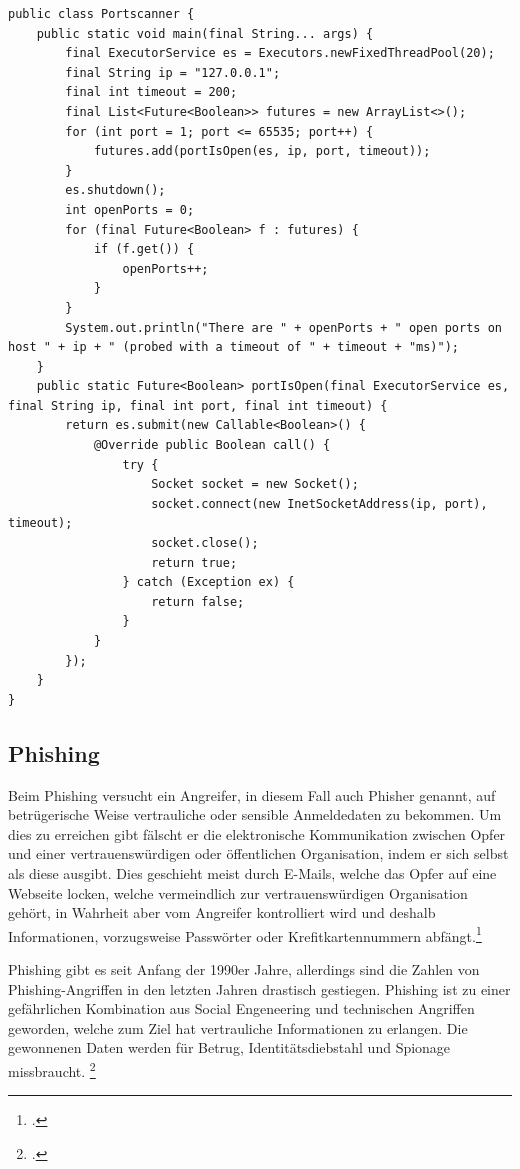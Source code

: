 \begin{scriptsize}
\begin{lstlisting}
public class Portscanner {
    public static void main(final String... args) {
        final ExecutorService es = Executors.newFixedThreadPool(20);
        final String ip = "127.0.0.1";
        final int timeout = 200;
        final List<Future<Boolean>> futures = new ArrayList<>();
        for (int port = 1; port <= 65535; port++) {
            futures.add(portIsOpen(es, ip, port, timeout));
        }
        es.shutdown();
        int openPorts = 0;
        for (final Future<Boolean> f : futures) {
            if (f.get()) {
                openPorts++;
            }
        }
        System.out.println("There are " + openPorts + " open ports on host " + ip + " (probed with a timeout of " + timeout + "ms)");
    }
    public static Future<Boolean> portIsOpen(final ExecutorService es, final String ip, final int port, final int timeout) {
        return es.submit(new Callable<Boolean>() {
            @Override public Boolean call() {
                try {
                    Socket socket = new Socket();
                    socket.connect(new InetSocketAddress(ip, port), timeout);
                    socket.close();
                    return true;
                } catch (Exception ex) {
                    return false;
                }
            }
        });
    }
}
\end{lstlisting}
\end{scriptsize}


\subsection{Phishing}

Beim Phishing versucht ein Angreifer, in diesem Fall auch Phisher genannt, auf betrügerische Weise vertrauliche oder sensible Anmeldedaten zu bekommen. Um dies zu erreichen gibt fälscht er die elektronische Kommunikation zwischen Opfer und einer vertrauenswürdigen oder öffentlichen Organisation, indem er sich selbst als diese ausgibt. Dies geschieht meist durch E-Mails, welche das Opfer auf eine Webseite locken, welche vermeindlich zur vertrauenswürdigen Organisation gehört, in Wahrheit aber vom Angreifer kontrolliert wird und deshalb Informationen, vorzugsweise Passwörter oder Krefitkartennummern abfängt.\footcite[Vgl.][1]{phishing}

Phishing gibt es seit Anfang der 1990er Jahre, allerdings sind die Zahlen von Phishing-Angriffen in den letzten Jahren drastisch gestiegen. Phishing ist zu einer gefährlichen Kombination aus Social Engeneering und technischen Angriffen geworden, welche zum Ziel hat vertrauliche Informationen zu erlangen. Die gewonnenen Daten werden für Betrug, Identitätsdiebstahl und Spionage missbraucht. \footcite[Vgl.][1\psq]{phishing}

